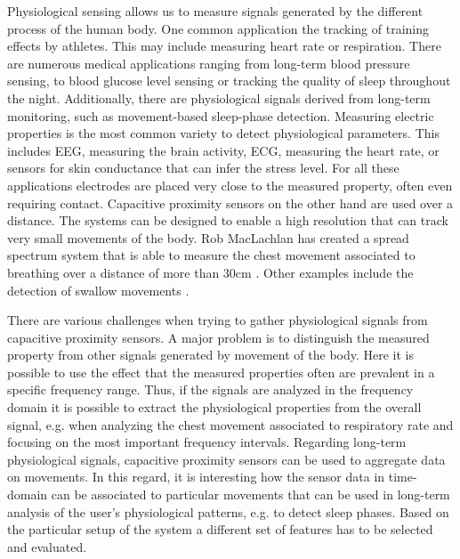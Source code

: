 Physiological sensing allows us to measure signals generated by the different process of the human body. One common application the tracking of training effects by athletes. This may include measuring heart rate or respiration. There are numerous medical applications ranging from long-term blood pressure sensing, to blood glucose level sensing or tracking the quality of sleep throughout the night. Additionally, there are physiological signals derived from long-term monitoring, such as movement-based sleep-phase detection. Measuring electric properties is the most common variety to detect physiological parameters. This includes EEG, measuring the brain activity, ECG,  measuring the heart rate, or sensors for skin conductance that can infer the stress level. For all these applications electrodes are placed very close to the measured property, often even requiring contact. Capacitive proximity sensors on the other hand are used over a distance. The systems can be designed to enable a high resolution that can track very small movements of the body. Rob MacLachlan has created a spread spectrum system that is able to measure the chest movement associated to breathing over a distance of more than 30cm \cite{MacLachlan2004}. Other examples include the detection of swallow movements \cite{cheng2010active}. 

There are various challenges when trying to gather physiological signals from capacitive proximity sensors. A major problem is to distinguish the measured property from other signals generated by movement of the body. Here it is possible to use the effect that the measured properties often are prevalent in a specific frequency range. Thus, if the signals are analyzed in the frequency domain it is possible to extract the physiological properties from the overall signal, e.g. when analyzing the chest movement associated to respiratory rate and focusing on the most important frequency intervals. Regarding long-term physiological signals, capacitive proximity sensors can be used to aggregate data on movements. In this regard, it is interesting how the sensor data in time-domain can be associated to particular movements that can be used in long-term analysis of the user's physiological patterns, e.g. to detect sleep phases. Based on the particular setup of the system a different set of features has to be selected and evaluated.

